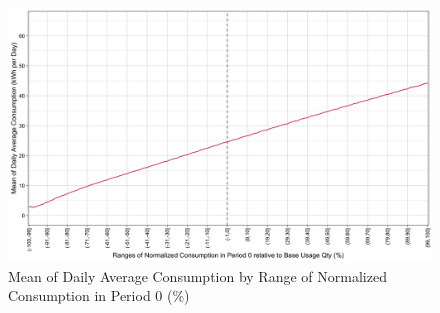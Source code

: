 \begin{figure}
    \centering
    \includegraphics[scale = 0.15]{02_Plots/SMUD-Billing-Data_RD-Design_Mean-by-Range}
    \caption{Mean of Daily Average Consumption by Range of Normalized Consumption in Period 0 (\%)}
    \label{Figure:Mean-by-Ranges}
\end{figure}








